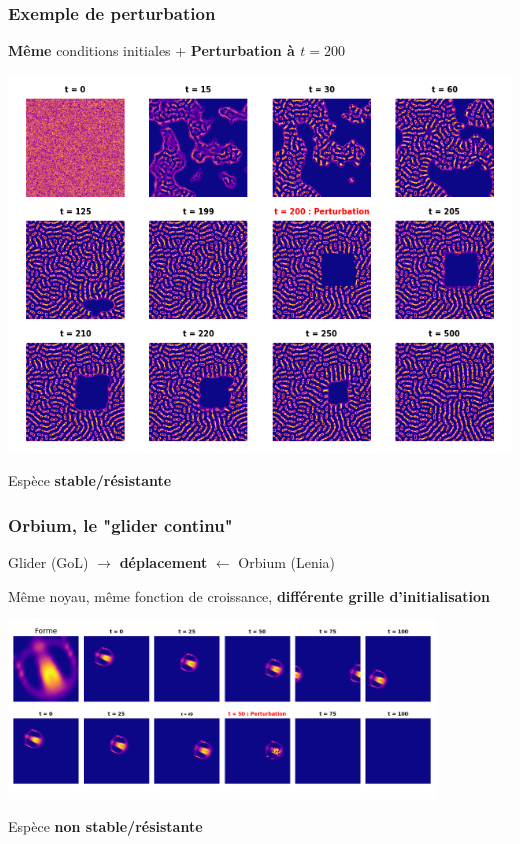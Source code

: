 \documentclass[aspectratio=43]{beamer}
\begin{document}
\begin{frame}
	\frametitle{Exemple de perturbation}

	\centering

	\textbf{M\^eme} conditions initiales + \textbf{Perturbation \`a $t = 200$}

	\includegraphics[width=.75\textwidth]{evolution_lenia_random_init_perturbation.png}

	Esp\`ece \textbf{stable/r\'esistante}

\end{frame}

\begin{frame}
	\frametitle{Orbium, le "glider continu"}

	\centering

	Glider (GoL) $\rightarrow$ \textbf{d\'eplacement} $\leftarrow$ Orbium (Lenia)

	\vspace{5pt}

	M\^eme noyau, m\^eme fonction de croissance, \textbf{diff\'erente grille d'initialisation}

	\includegraphics[width=0.85\textwidth]{evolution_orbium.png}

	Esp\`ece \textbf{non stable/r\'esistante}

\end{frame}
\end{document}
